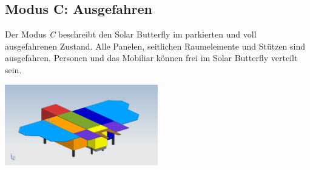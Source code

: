 

\subsection{Modus C: Ausgefahren}
Der Modus \emph{C} beschreibt den Solar Butterfly im parkierten und voll ausgefahrenen Zustand. Alle Panelen, seitlichen Raumelemente und Stützen sind ausgefahren. Personen und das Mobiliar können frei im Solar Butterfly verteilt sein.\\

\begin{center}
  \includegraphics[width=0.5\textwidth]{04_Figures/C.png}
  \label{Modus C}
\end{center}


